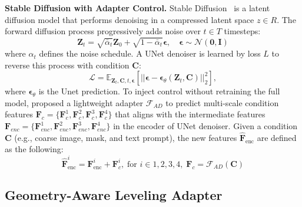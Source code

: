 \noindent\textbf{Stable Diffusion with Adapter Control.}
Stable Diffusion~\cite{Rombach_2022_SD2} is a latent diffusion model that performs denoising in a compressed latent space $z\in R$. The forward diffusion process progressively adds noise over $t\in T$ timesteps:
\begin{equation}
\mathbf{Z}_t = \sqrt{\bar{\alpha}_t} \mathbf{Z}_0 + \sqrt{1 - \bar{\alpha}_t} \boldsymbol{\epsilon}, \quad \boldsymbol{\epsilon} \sim \mathcal{N}(\mathbf{0}, \mathbf{I})
\end{equation}
where ${\alpha}_t$ defines the noise schedule. A UNet denoiser is learned by loss $L$ to reverse this process with condition $\mathbf{C}$:
\begin{equation}
\mathcal{L} = \mathbb{E}_{\mathbf{Z}_t,\mathbf{C}, t, \boldsymbol{\epsilon}} \left[ ||\boldsymbol{\epsilon} - \boldsymbol{\epsilon}_\theta(\mathbf{Z}_t, \mathbf{C})||_2^2 \right],
\end{equation}
where $\boldsymbol{\epsilon}_\theta$ is the Unet prediction. To inject control without retraining the full model, \cite{mou2024t2i} proposed a lightweight adapter $\mathcal{F}_{AD}$ to predict multi-scale condition features $\mathbf{F}_{c}=\{\mathbf{F}_c^1, \mathbf{F}_c^2, \mathbf{F}_c^3, \mathbf{F}_c^4\}$ that aligns with the intermediate features $\mathbf{F}_{enc}=\{\mathbf{F}_{enc}^1, \mathbf{F}_{enc}^2, \mathbf{F}_{enc}^3, \mathbf{F}_{enc}^4\}$ in the encoder of UNet denoiser. Given a condition $\mathbf{C}$ (e.g., coarse image, mask, and text prompt), the new features $\hat{\mathbf{F}}_{\text{enc}}$ are defined as the following:
\begin{equation}
\hat{\mathbf{F}}_{\text{enc}}^i = \mathbf{F}_{\text{enc}}^i + \mathbf{F}_c^i, \; \text{for } i \in {1,2,3,4}, \; \mathbf{F}_c = \mathcal{F}_{AD}(\mathbf{C})
\end{equation}


\subsection{Geometry-Aware Leveling Adapter}

